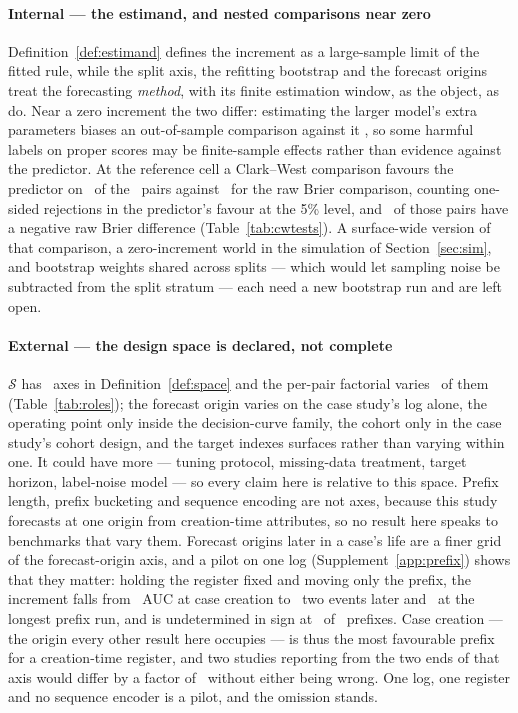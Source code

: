 \documentclass[11pt,3p,review,authoryear]{elsarticle}
\theoremstyle{definition}
\begin{document}
\paragraph{Internal --- the estimand, and nested comparisons near zero}
Definition~\ref{def:estimand} defines the increment as a large-sample limit
of the fitted rule, while the split axis, the refitting bootstrap and the
forecast origins treat the forecasting \emph{method}, with its finite
estimation window, as the object, as \citet{giacomini2006conditional} do.
Near a zero increment the two differ: estimating the larger model's extra
parameters biases an out-of-sample comparison against it
\citep{clark2007approximately}, so some harmful labels on proper scores may
be finite-sample effects rather than evidence against the predictor. At the
reference cell a Clark--West comparison favours the predictor on
\nRejectCw\ of the \nPairs\ pairs against \nRejectDmBrier\ for the raw
Brier comparison, counting one-sided rejections in the predictor's favour at
the 5\% level, and \nCwReverses\ of those pairs have a negative raw Brier
difference (Table~\ref{tab:cwtests}). A surface-wide version of that comparison, a
zero-increment world in the simulation of Section~\ref{sec:sim}, and
bootstrap weights shared across splits --- which would let sampling noise be
subtracted from the split stratum --- each need a new bootstrap run and are
left open.

\paragraph{External --- the design space is declared, not complete}
$\mathcal{S}$ has \nAxes\ axes in Definition~\ref{def:space} and the per-pair
factorial varies \nPerPairAxes\ of them (Table~\ref{tab:roles}); the forecast
origin varies on the case study's log alone, the operating point only inside
the decision-curve family, the cohort only in the case study's cohort design,
and the target indexes surfaces rather than varying within one. It could have
more --- tuning protocol, missing-data treatment, target horizon, label-noise
model --- so every claim here is relative to this space. Prefix length,
prefix bucketing and sequence encoding are not axes, because this study
forecasts at one origin from creation-time attributes, so no result here
speaks to benchmarks that vary them. Forecast origins later in a case's life
are a finer grid of the forecast-origin axis, and a pilot on one log
(Supplement~\ref{app:prefix}) shows that they matter: holding the register
fixed and moving only the prefix, the increment falls from \VPrefixZero\ AUC
at case creation to \VPrefixTwo\ two events later and \VPrefixEight\ at the
longest prefix run, and is undetermined in sign at \nPrefixUnresolved\ of
\nPrefixLevels\ prefixes. Case creation --- the origin every other result here
occupies --- is thus the most favourable prefix for a creation-time register,
and two studies reporting from the two ends of that axis would differ by a
factor of \prefixDropFactor\ without either being wrong. One log, one register
and no sequence encoder is a pilot, and the omission stands.
\end{document}

